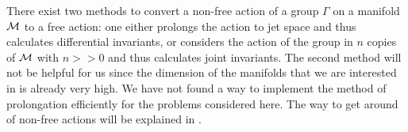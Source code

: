 There exist two methods to convert a non-free action of a group $\Gamma$ on a
manifold $\mathcal{M}$ to a free action: one either prolongs the action to jet space and thus calculates
differential invariants, or considers the action of the group in $n$ copies of $\mathcal{M}$ with $n>>0$
and thus calculates joint invariants. The second method will not be helpful for us since the dimension
of the manifolds that we are interested in is already very high. We have not found a way to implement
the method of prolongation efficiently for the problems considered here. The way to get around of
non-free actions will be explained in .

